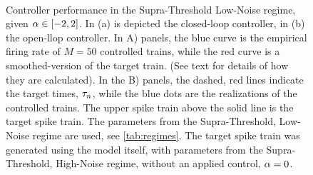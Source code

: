  
\begin{figure}[htp]
\begin{center}
\\
  \caption[]{Controller performance in the Supra-Threshold Low-Noise regime,
  given $\alpha \in [-2,2]$.
  In (a) is depicted the closed-loop controller, in (b) the open-llop
  controller.
  In A) panels, the blue curve is the empirical firing
  rate of $M=50$ controlled trains, while the red curve is a
  smoothed-version of the target train. 
  (See text for details of how they are calculated). 
  In the B) panels, the dashed, red lines indicate the target times,
  ${\tau}_n$, while the blue dots are the realizations of the controlled trains.  
  The upper spike train above the solid line is the target spike train.
  The parameters from the Supra-Threshold, Low-Noise regime are used, see
  \cref{tab:regimes}. 
  The target spike train was generated
  using the model itself, with parameters from the Supra-Threshold, High-Noise regime, without an applied
  control, $\alpha=0$.
  } 
  \label{fig:targettrain_lownoise} 
\end{center} 
\end{figure}

